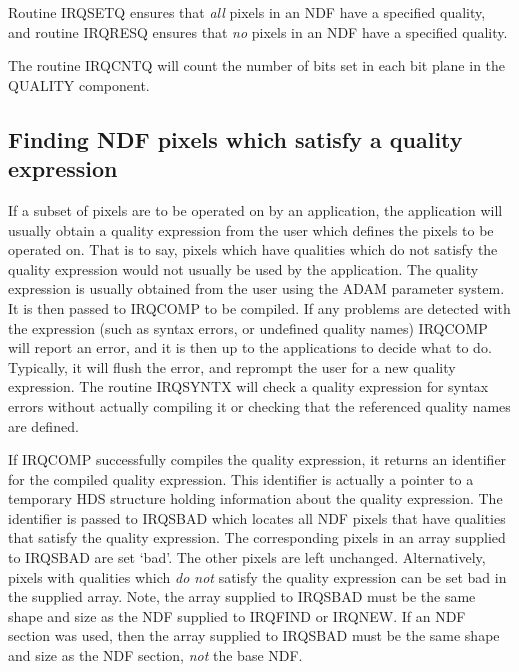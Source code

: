 \documentclass[twoside,11pt]{article}
\newcommand{\htmlref}[2]{#1}
\newcommand{\xref}[3]{#1}
\newcommand{\xlabel}[1]{}
\renewcommand{\_}{\texttt{\symbol{95}}}
\begin{document}
Routine \htmlref{IRQ\_SETQ}{IRQ_SETQ} ensures that {\em all} pixels in an
NDF have a specified quality, and routine IRQ\_RESQ ensures that {\em no}
pixels in an NDF have a specified quality. 

The routine \htmlref{IRQ\_CNTQ}{IRQ_CNTQ} will count the number of bits
set in each bit plane in the QUALITY component. 

\subsection{\xlabel{SEC:QFIND}Finding NDF pixels which satisfy a quality expression}
\label {SEC:QFIND}

If a subset of pixels are to be operated on by an application, the
application will usually obtain a quality expression from the user which
defines the pixels to be operated on. That is to say, pixels which have
qualities which do not satisfy the quality expression would not usually
be used by the application. The quality expression is usually obtained
from the user using the \xref{ADAM parameter system}{sun114}{}. It is
then passed to \htmlref{IRQ\_COMP}{IRQ_COMP} to be compiled. If any
problems are detected with the expression (such as syntax errors, or
undefined quality names) IRQ\_COMP will report an error, and it is then
up to the applications to decide what to do. Typically, it will flush the
error, and reprompt the user for a new quality expression. The routine
\htmlref{IRQ\_SYNTX}{IRQ_SYNTX} will check a quality expression for
syntax errors without actually compiling it or checking that the
referenced quality names are defined.

If IRQ\_COMP successfully compiles the quality expression, it returns an
identifier for the compiled quality expression. This identifier is
actually a pointer to a temporary HDS structure holding information about
the quality expression. The identifier is passed to
\htmlref{IRQ\_SBAD}{IRQ_SBAD} which locates all NDF pixels that have
qualities that satisfy the quality expression. The corresponding pixels
in an array supplied to IRQ\_SBAD are set `bad'. The other pixels are
left unchanged. Alternatively, pixels with qualities which {\em do not}
satisfy the quality expression can be set bad in the supplied array.
Note, the array supplied to IRQ\_SBAD must be the same shape and size as
the NDF supplied to \htmlref{IRQ\_FIND}{IRQ_FIND} or
\htmlref{IRQ\_NEW}{IRQ_NEW}. If an NDF section was used, then the array
supplied to IRQ\_SBAD must be the same shape and size as the NDF section,
{\em not} the base NDF. 
\end{document}
